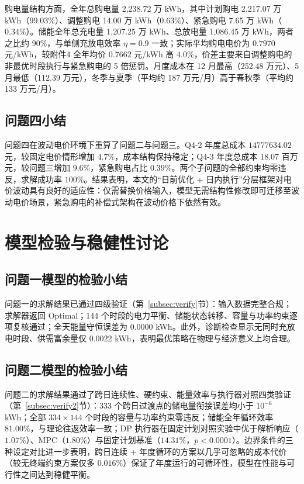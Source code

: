 \documentclass[zihao=-4,a4paper,UTF8,fontset=none]{ctexart}
\begin{document}
购电量结构方面，全年总购电量 2{,}238.72 万 kWh，其中计划购电 2{,}217.07 万 kWh（$99.03\%$）、调整购电 14.00 万 kWh（$0.63\%$）、紧急购电 7.65 万 kWh（$0.34\%$）。储能全年总充电量 1{,}207.25 万 kWh、总放电量 1{,}086.45 万 kWh，两者之比约 $90\%$，与单侧充放电效率 $\eta=0.9$ 一致；实际平均购电电价为 $0.7970$ 元/kWh，较附件4 全年均价 $0.7662$ 元/kWh 高 $4.0\%$，价差主要来自调整购电的非最优时段执行与紧急购电的 5 倍惩罚。月度成本在 12 月最高（252.48 万元）、5 月最低（112.39 万元），冬季与夏季（平均约 187 万元/月）高于春秋季（平均约 133 万元/月）。

\subsection{问题四小结}

问题四在波动电价环境下重算了问题二与问题三。Q4-2 年度总成本 $\num{14777634.02}$ 元，较固定电价情形增加 $4.7\%$，成本结构保持稳定；Q4-3 年度总成本 18.07 百万元，较问题三增加 $9.6\%$，紧急购电占比 $0.39\%$。两个子问题的全部约束均零违反，求解成功率 $100\%$。结果表明，本文的“日前优化 + 日内执行”分层框架对电价波动具有良好的适应性：仅需替换价格输入，模型无需结构性修改即可迁移至波动电价场景，紧急购电的补偿式架构在波动价格下依然有效。

\section{模型检验与稳健性讨论}

\subsection{问题一模型的检验小结}

问题一的求解结果已通过四级验证（第~\ref{subsec:verify}节）：输入数据完整合规；求解器返回 Optimal；144 个时段的电力平衡、储能状态转移、容量与功率约束逐项复核通过；全天能量守恒误差为 $0.0000$ kWh。此外，诊断检查显示无同时充放电时段、供需富余量仅 $0.0022$ kWh，表明最优策略在物理与经济意义上均合理。

\subsection{问题二模型的检验小结}

问题二的求解结果通过了跨日连续性、硬约束、能量效率与执行器对照四类验证（第~\ref{subsec:verify2}节）：333 个跨日过渡点的储电量衔接误差均小于 $10^{-6}$ kWh；全部 $334\times144$ 个时段的容量与功率约束零违反；储能全年循环效率 $81.00\%$，与理论往返效率一致；DP 执行器在固定计划对照实验中优于解析响应（$1.07\%$）、MPC（$1.80\%$）与固定计划基准（$14.31\%$，$p<0.0001$）。边界条件的三种设定对比进一步表明，跨日连续 + 年度循环的方案以几乎可忽略的成本代价（较无终端约束方案仅多 $0.016\%$）保证了年度运行的可循环性，模型在性能与可行性之间达到稳健平衡。
\end{document}
